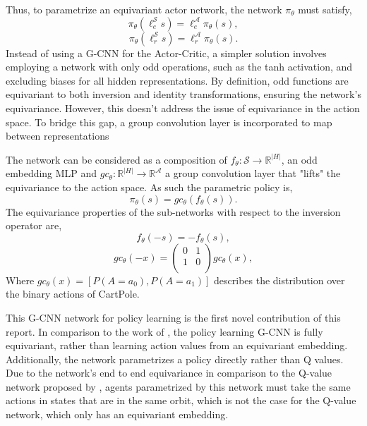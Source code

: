 Thus, to parametrize an equivariant actor network, the network $\pi_\theta$ must satisfy,
\begin{equation}
	\pi_\theta(\ell^\mathcal{S}_e s) = \ell^\mathcal{A}_e \pi_\theta(s),
\end{equation}
\begin{equation}
	\pi_\theta(\ell^\mathcal{S}_r s) = \ell^\mathcal{A}_r \pi_\theta(s).
\end{equation}
Instead of using a G-CNN for the Actor-Critic, a simpler solution involves employing a network with only odd operations, such as the tanh activation, and excluding biases for all hidden representations. By definition, odd functions are equivariant to both inversion and identity transformations, ensuring the network's equivariance. However, this doesn't address the issue of equivariance in the action space. To bridge this gap, a group convolution layer is incorporated to map between representations

The network can be considered as a composition of $f_\theta : \mathcal{S} \rightarrow \mathbb{R}^{|H|}$, an odd embedding MLP and $gc_\theta: \mathbb{R}^{|H|} \rightarrow \mathbb{R}^{\mathcal{A}}$ a group convolution layer that "lifts" the equivariance to the action space. As such the parametric policy is,
\begin{equation}
	\pi_\theta(s) = gc_\theta(f_\theta(s)).
\end{equation}
The equivariance properties of the sub-networks with respect to the inversion operator are,
\begin{equation}
	f_\theta(-s) = -f_\theta(s),
\end{equation}
\begin{equation}
	gc_\theta(-x) =
	\begin{pmatrix}
		0 & 1 \\
		1 & 0 \\
	\end{pmatrix}
	gc_\theta(x),
\end{equation}
Where $gc_\theta(x) = [P(A=a_0), P(A=a_1)]$ describes the distribution over the binary actions of CartPole.

This G-CNN network for policy learning is the first novel contribution of this report. In comparison to the work of \cite{mondal2020group}, the policy learning G-CNN is fully equivariant, rather than learning action values from an equivariant embedding. Additionally, the network parametrizes a policy directly rather than Q values. Due to the network's end to end equivariance in comparison to the Q-value network proposed by \cite{mondal2020group}, agents parametrized by this network must take the same actions in states that are in the same orbit, which is not the case for the Q-value network, which only has an equivariant embedding.

